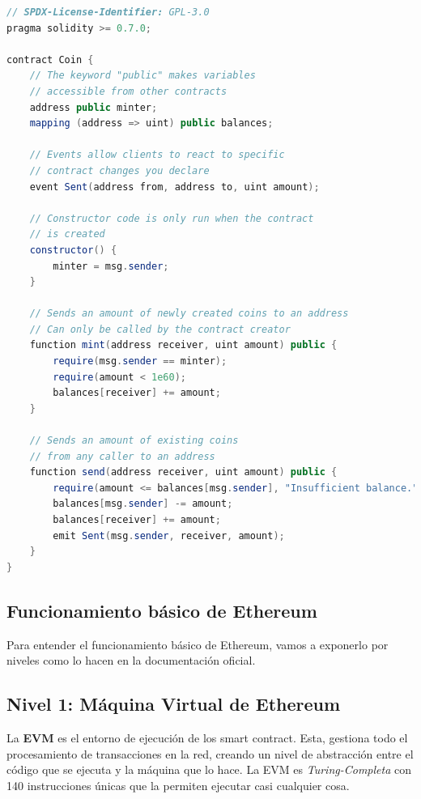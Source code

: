 \begin{lstlisting}[language=Java,float=ht,caption={[Solidity Contract]Ejemplo de código fuente de un smart contract escrito en Solidity},label=lst:java]
// SPDX-License-Identifier: GPL-3.0
pragma solidity >= 0.7.0;

contract Coin {
    // The keyword "public" makes variables
    // accessible from other contracts
    address public minter;
    mapping (address => uint) public balances;

    // Events allow clients to react to specific
    // contract changes you declare
    event Sent(address from, address to, uint amount);

    // Constructor code is only run when the contract
    // is created
    constructor() {
        minter = msg.sender;
    }

    // Sends an amount of newly created coins to an address
    // Can only be called by the contract creator
    function mint(address receiver, uint amount) public {
        require(msg.sender == minter);
        require(amount < 1e60);
        balances[receiver] += amount;
    }

    // Sends an amount of existing coins
    // from any caller to an address
    function send(address receiver, uint amount) public {
        require(amount <= balances[msg.sender], "Insufficient balance.");
        balances[msg.sender] -= amount;
        balances[receiver] += amount;
        emit Sent(msg.sender, receiver, amount);
    }
}
\end{lstlisting}

\subsection{Funcionamiento básico de Ethereum}

Para entender el funcionamiento básico de Ethereum, vamos a exponerlo por niveles como lo hacen en la documentación oficial\cite{etherStack}. 

\subsection{Nivel 1: Máquina Virtual de Ethereum} 

La \textbf{EVM} es el entorno de ejecución de los smart contract. Esta, gestiona todo el procesamiento de transacciones en la red, creando un nivel de abstracción entre el código que se ejecuta y la máquina que lo hace. La EVM es \emph{Turing-Completa} con 140 instrucciones únicas que la permiten ejecutar casi cualquier cosa. 

